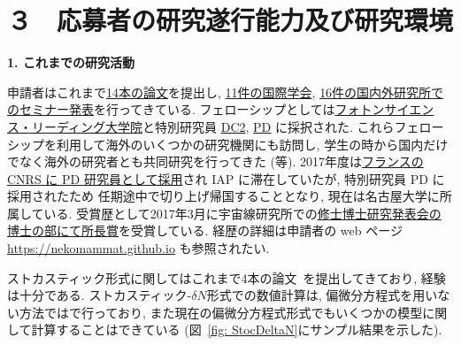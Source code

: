 \documentclass[11pt,a4j,dvipdfmx]{jarticle} 					%
\newcommand{\研究課題名}{\mgfamily\sffamily ストカスティック形式で迫る重力と量子論}
\newcommand{\研究機関名}{\mgfamily\sffamily 名古屋大学}
\newcommand{\研究代表者氏名}{\mgfamily\sffamily 多田祐一郎}
\newcommand{\研究期間の最終元号年度}{34}  %
\begin{document}
\begin{comment}
		風呂で巨大な温泉卵について考えていて、ふと思いついた。

	準備はしようとしている。

	唯一無二。
\end{comment}




\section{３　応募者の研究遂行能力及び研究環境}


\begin{mdframed}[roundcorner=0.5zw,
	innertopmargin=0.8zw,innerbottommargin=0.8zw,
	linecolor=black!50,linewidth=0.2zw,
	backgroundcolor=black!10]
	{\bfseries\gtfamily\sffamily\large 1. これまでの研究活動}
\end{mdframed}

申請者はこれまで\ul{14本の論文}を提出し, \ul{11件の国際学会}, \ul{16件の国内外研究所でのセミナー発表}を行ってきている.
フェローシップとしては\ul{フォトンサイエンス・リーディング大学院}と特別研究員 \ul{DC2}, \ul{PD} に採択された.
これらフェローシップを利用して海外のいくつかの研究機関にも訪問し, 学生の時から国内だけでなく海外の研究者とも共同研究を行ってきた 
(\cite{Tada:2016pmk}等). 2017年度は\ul{フランスの CNRS に PD 研究員として採用}され IAP に滞在していたが, 特別研究員 PD に採用されたため
任期途中で切り上げ帰国することとなり, 現在は名古屋大学に所属している. 受賞歴として2017年3月に宇宙線研究所での\ul{修士博士研究発表会の
博士の部にて所長賞}を受賞している.
経歴の詳細は申請者の web ページ \url{https://nekomammat.github.io} も参照されたい.

ストカスティック形式に関してはこれまで4本の論文~\cite{Fujita:2013cna,Fujita:2014tja,Kawasaki:2015ppx,Pinol:2018euk}を提出してきており,
経験は十分である. ストカスティック-$\delta N$形式での数値計算は, 偏微分方程式を用いない方法では\cite{Fujita:2014tja,Kawasaki:2015ppx}で行っており,
また現在の偏微分方程式形式でもいくつかの模型に関して計算することはできている (図~\ref{fig: StocDeltaN}にサンプル結果を示した).
\end{document}

